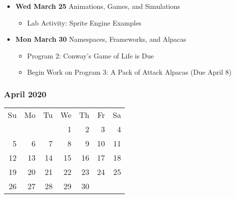 \begin{itemize}
\item\textbf{Wed March 25} Animations, Games, and Simulations
    \begin{itemize}
        \item Lab Activity: Sprite Engine Examples 
    \end{itemize} 
\item\textbf{Mon March 30} Namespaces, Frameworks, and Alpacas
    \begin{itemize}
        \item Program 2: Conway's Game of Life is Due
        \item Begin Work on Program 3: A Pack of Attack Alpacas (Due April 8)
    \end{itemize}
\end{itemize}

\subsubsection*{April 2020}
\begin{tabular}{rrrrrrr}
Su & Mo & Tu & We & Th & Fr & Sa\\
   &    &    &  1 &  2 &  3 &  4\\
 5 &  6 &  7 &  8 &  9 & 10 & 11\\
12 & 13 & 14 & 15 & 16 & 17 & 18\\
19 & 20 & 21 & 22 & 23 & 24 & 25\\ 
26 & 27 & 28 & 29 & 30 &    &\\ 
\end{tabular}
